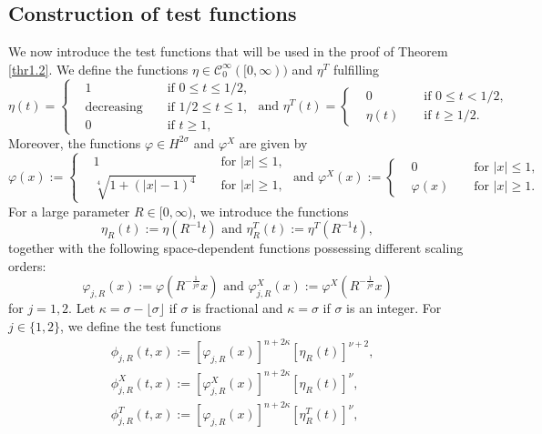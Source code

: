 \documentclass[11pt,reqno]{amsart}
\newcommand{\tron}[1]{\left( #1 \right)}
\numberwithin{equation}{section}
\newcommand{\flo}[1]{\lfloor #1 \rfloor }
\begin{document}
\subsection{Construction of test functions}\label{subsec4.1}
We now introduce the test functions that will be used in the proof of Theorem \ref{thr1.2}. We define the functions $\eta \in \mathcal{C}_0^{\infty}([0,\infty))$ and $\eta^T$ fulfilling 
\[
\eta(t)=
\left\{
\begin{aligned}
    &1 &&\text{ if }0\leq t\leq 1/2,\\
    &\text{decreasing}&&\text{ if }1/2\leq t\leq 1,\\
    &0 &&\text{ if }t\geq 1,
\end{aligned}
\right.
\text{ and }
\eta^T(t)=
\left\{
\begin{aligned}
&0 &&\text{ if }0\leq t<1/2,\\
&\eta(t) &&\text{ if }t\geq 1/2.
\end{aligned}
\right.
\]
Moreover, the functions $\varphi\in H^{2\sigma}$ and $\varphi^X$ are given by 
\[
\varphi(x):=
\left\{
\begin{aligned}
&1&&\text{ for $|x|\leq 1$},\\
&\sqrt[4]{1+(|x|-1)^{4}}&&\text{ for $|x|\geq 1$},
\end{aligned}
\right.
\text{ and }
\varphi^X(x):=
\left\{
\begin{aligned}
&0&&\text{ for }|x|\leq 1,\\
&\varphi(x)&&\text{ for }|x|\geq 1.
\end{aligned}
\right.
\]
For a large parameter $R\in [0,\infty)$, we introduce the functions
\[
\eta_R(t):=\eta\tron{R^{-1}t}\text{ and }\eta^T_{R}(t):=\eta^T\tron{R^{-1}t},
\]
together with the following space-dependent functions possessing different scaling orders:
\[
\varphi_{j,R}(x):=\varphi\tron{R^{-\frac{1}{j\sigma}}x}\text{ and }\varphi^X_{j,R}(x):=\varphi^X\tron{R^{-\frac{1}{j\sigma}}x}
\]
for $j=1,2$. Let $\kappa=\sigma-\flo{\sigma}$ if $\sigma$ is fractional and $\kappa=\sigma$ if $\sigma$ is an integer. For $j\in \{1,2\}$, we define the test functions
\begin{equation}\label{testfunc}
\begin{aligned}
&\phi_{j,R}(t,x):=\left[\varphi_{j,R}(x)\right]^{n+2\kappa}[\eta_{R}(t)]^{\nu+2},\\
&\phi^{X}_{j,R}(t,x):=\left[\varphi^X_{j,R}(x)\right]^{n+2\kappa}[\eta_{R}(t)]^{\nu},\\
&\phi^{T}_{j,R}(t,x):=\left[\varphi_{j,R}(x)\right]^{n+2\kappa}[\eta^T_{R}(t)]^{\nu},
\end{aligned}
\end{equation}
\end{document}
